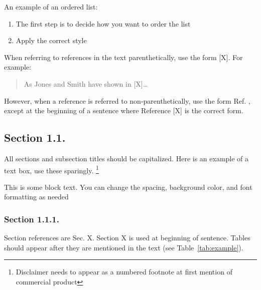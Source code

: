 An example of an ordered list:
\begin{enumerate}
    \item The first step is to decide how you want to order the list
    \item Apply the correct style
\end{enumerate}

When referring to references in the text parenthetically, use the form [X]. For example: 
\begin{quote}
As Jones and Smith have shown in [X]… 
\end{quote}
However, when a reference is referred to non-parenthetically, use the form Ref. \cite{Caxton,Eston1993,Farindon,FIPS1402,giancoli2008physics,Isley,Joslin,Maloney2016,MSU-CSE-06-2,Prives2016,Roberts1982,SP80053r4,Xiong2015}, except at the beginning of a sentence where Reference [X] is the correct form.

 \tagpdfparaOff {}
\subsection{Section 1.1.}
\tagmcend
 \tagstructend
 \label{level2:headingscap}
\tagpdfparaOn
All sections and subsection titles should be capitalized. Here is an example of a text box, use these sparingly.\tagpdfparaOff
\footnote{Disclaimer needs to appear as a numbered footnote at first mention of commercial product}

\begin{tcolorbox}%
This is some block text. You can change the spacing, background color, and font formatting as needed
\end{tcolorbox}
\tagmcend
\tagstructend

 \tagpdfparaOff {}
\subsubsection{Section 1.1.1.}
\tagmcend
 \tagstructend
\label{level3:headingscap}
\tagpdfparaOn
Section references are Sec. X. Section X is used at beginning of sentence.
Tables should appear after they are mentioned in the text (see Table~\ref{tab:example}). 

